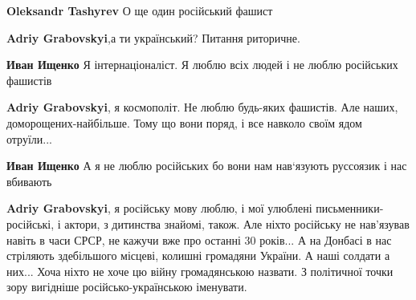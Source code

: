 \begin{itemize}
\begin{itemize}
\textbf{Oleksandr Tashyrev} О ще один російський фашист

 
\textbf{Adriy Grabovskyi},а ти український? Питання риторичне.

 
\textbf{Иван Ищенко} Я інтернаціоналіст. Я люблю всіх людей і не люблю російських фашистів

 
\textbf{Adriy Grabovskyi}, я космополіт. Не люблю будь-яких фашистів. Але наших, доморощених-найбільше. Тому що вони поряд, і все навколо своїм ядом отруїли...

 
\textbf{Иван Ищенко} А я не люблю російських бо вони нам нав‘язують руссоязик і нас вбивають

 
\textbf{Adriy Grabovskyi}, я російську мову люблю, і мої улюблені
письменники-російські, і актори, з дитинства знайомі, також. Але ніхто російську
не нав'язував навіть в часи СРСР, не кажучи вже про останні 30 років... А на
Донбасі в нас стріляють здебільшого місцеві, колишні громадяни України. А наші
солдати а них... Хоча ніхто не хоче цю війну громадянською назвати. З
політичної точки зору вигідніше російсько-українською іменувати.



\end{itemize}
\end{itemize}
